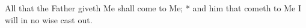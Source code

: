 All that the Father giveth Me shall come to Me; * and him that cometh to Me I will in no wise cast out.